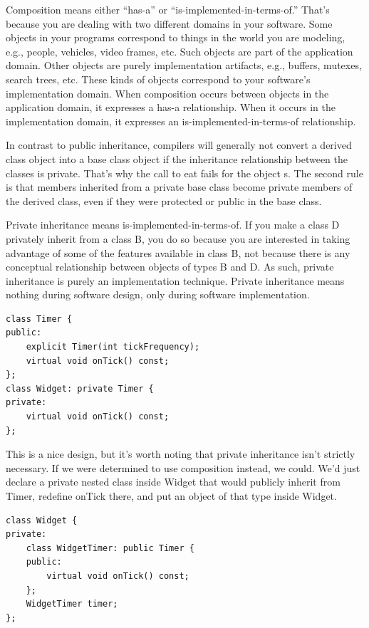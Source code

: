 \documentclass[a4paper,12pt,notitlepage]{article}
\begin{document}
Composition means either “has-a” or “is-implemented-in-terms-of.” That's because you are dealing with two different domains in your software. Some objects in your programs correspond to things in the world you are
modeling, e.g., people, vehicles, video frames, etc. Such objects are part of the application domain. Other objects are purely implementation artifacts, e.g., buffers, mutexes, search trees, etc. These kinds of
objects correspond to your software's implementation domain. When composition occurs between objects in the application domain, it expresses a has-a relationship. When it occurs in the implementation domain, it expresses an is-implemented-in-terms-of relationship.

In contrast to public inheritance, compilers will generally not convert a derived class object into a base class object if the inheritance relationship between the classes is private. That's why the call to eat fails for the object s. The second rule is that members inherited from a private base class become private members of the derived class, even if they were protected or public in the base class.

Private inheritance means is-implemented-in-terms-of. If you make a class D privately inherit from a class B, you do so because you are interested in taking advantage of some of the features available in class B, not because there is any conceptual relationship between objects of types B and D. As such, private inheritance is purely an implementation technique. Private inheritance means nothing during software design, only during software implementation.

\begin{verbatim}
class Timer {
public:
    explicit Timer(int tickFrequency);
    virtual void onTick() const;
};
class Widget: private Timer {
private:
    virtual void onTick() const;
};
\end{verbatim}

This is a nice design, but it's worth noting that private inheritance isn't strictly necessary. If we were determined to use composition instead, we could. We'd just declare a private nested class inside Widget that would publicly inherit from Timer, redefine onTick there, and put an object of that type inside Widget.

\begin{verbatim}
class Widget {
private:
    class WidgetTimer: public Timer {
    public:
        virtual void onTick() const;
    };
    WidgetTimer timer;
};
\end{verbatim}
\end{document}
